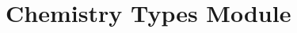 \documentclass[12pt]{article}
\newcommand{\header}[1]{
    \section*{#1 Module}
}
\newenvironment{module}{}{\newpage}
\begin{document}
\begin{module}
    \header{Chemistry Types}
\end{module}
\end{document}
